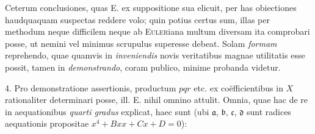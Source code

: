 \documentclass[twoside,12pt, showframe]{memoir}
\begin{document}
Ceterum conclusiones, quas \textsc{E.} ex suppositione sua elicuit, per has obiectiones haudquaquam suspectas reddere volo; quin potius certus sum, illas per methodum neque difficilem neque ab \textsc{Euler}iana multum diversam ita comprobari posse, ut nemini vel minimus scrupulus superesse debeat. Solam \textit{formam} reprehendo, quae quamvis in \textit{inveniendis} novis veritatibus magnae utilitatis esse possit, tamen in \textit{demonstrando}, coram publico, minime probanda videtur.

4. Pro demonstratione assertionis, productum \(pqr\) etc{.} ex co\"efficientibus in \(X\) rationaliter determinari posse, ill. \textsc{E.} nihil omnino attulit. Omnia, quae hac de re in aequationibus \textit{quarti gradus} explicat, haec sunt (ubi \(\mathfrak{a}\), \(\mathfrak{b}\), \(\mathfrak{c}\), \(\mathfrak{d}\) sunt radices aequationis propositae \(x^4 + B xx + C x + D = 0\)):
\end{document}
